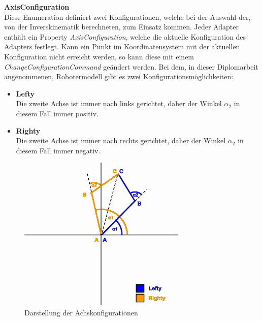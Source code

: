 \textbf{AxisConfiguration}\\
Diese Enumeration definiert zwei Konfigurationen, welche bei der Auswahl der, von der Inverskinematik berechneten, zum Einsatz kommen. Jeder Adapter enthält ein Property \textit{AxisConfiguration}, welche die aktuelle Konfiguration des Adapters festlegt. Kann ein Punkt im Koordinatensystem mit der aktuellen Konfiguration nicht erreicht werden, so kann diese mit einem \textit{ChangeConfigurationCommand} geändert werden.
Bei dem, in dieser Diplomarbeit angenommenen, Robotermodell gibt es zwei Konfigurationsmöglichkeiten:
\begin{itemize}
\item \textbf{Lefty}\\
Die zweite Achse ist immer nach links gerichtet, daher der Winkel $\alpha_2$ in diesem Fall immer positiv.
\item \textbf{Righty}\\
Die zweite Achse ist immer nach rechts gerichtet, daher der Winkel $\alpha_2$ in diesem Fall immer negativ.
\end{itemize}

\begin{figure}[H]
  \centering
  \begin{minipage}[t]{12 cm}
  	\centering
  	\includegraphics[width=8cm]{images/AxisConfiguration} 
    \caption{Darstellung der Achskonfigurationen}
  \end{minipage}
\end{figure}
